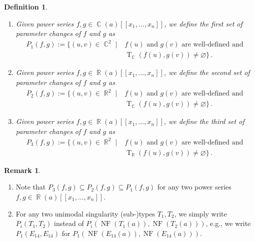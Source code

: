 \documentclass[noend]{amsproc}
\newtheorem{defn}[theorem]{Definition}
\theoremstyle{definition}
\newtheorem{remark}[theorem]{Remark}
\newcommand{\NF}[1]{\operatorname{NF}(#1)}
\DeclareMathOperator{\R}{\mathbb{R}}
\DeclareMathOperator{\C}{\mathbb{C}}
\DeclareMathOperator{\T}{T}
\begin{document}
\begin{defn}
\phantom{X}\hfill
\begin{enumerate}
\item
Given power series $f,g \in \C(a)[[x_1,\ldots,x_n]]$, we define the
first set of parameter changes of $f$ and $g$ as
\begin{align*}
P_1(f, g)
:= \{ (u, v) \in \C^2 \mid
&f(u) \text{ and } g(v) \text{ are well-defined and } \\
&\T_{\C}(f(u), g(v)) \neq \varnothing \} \,.
\end{align*}

\item
Given power series $f,g \in \R(a)[[x_1,\ldots,x_n]]$, we define the
second set of parameter changes of $f$ and $g$ as
\begin{align*}
P_2(f, g)
:= \{ (u, v) \in \R^2 \mid
&f(u) \text{ and } g(v) \text{ are well-defined and } \\
&\T_{\C}(f(u), g(v)) \neq \varnothing \} \,.
\end{align*}

\item
Given power series $f,g \in \R(a)[[x_1,\ldots,x_n]]$, we define the
third set of parameter changes of $f$ and $g$ as
\begin{align*}
P_3(f, g)
:= \{ (u, v) \in \R^2 \mid
&f(u) \text{ and } g(v) \text{ are well-defined and } \\
&\T_{\R}(f(u), g(v)) \neq \varnothing \} \,.
\end{align*}
\end{enumerate}
\end{defn}

\begin{remark}
\phantom{X}\hfill
\begin{enumerate}
\item
Note that $P_3(f, g) \subseteq P_2(f, g) \subseteq P_1(f, g)$ for any two power
series $f,g \in \R(a)[[x_1,\ldots,x_n]]$.

\item
For any two unimodal singularity (sub-)types $T_1, T_2$, we simply write
$P_i(T_1,T_2)$ instead of $P_i(\NF{T_1(a)}, \NF{T_2(a)})$, e.g., we write
$P_1(E_{14}, E_{14})$ for $P_1(\NF{E_{14}(a)}, \NF{E_{14}(a)})$.
\end{enumerate}
\end{remark}
\end{document}
